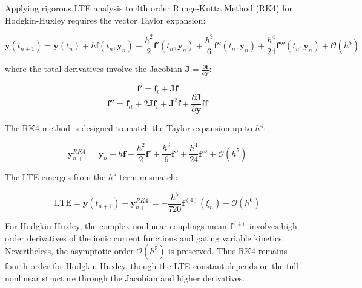 Applying rigorous LTE analysis to 4th order Runge-Kutta Method (RK4) for Hodgkin-Huxley requires the vector Taylor expansion:

\[
\mathbf{y}(t_{n+1}) = \mathbf{y}(t_n) + h\mathbf{f}(t_n, \mathbf{y}_n) + \frac{h^2}{2}\mathbf{f}'(t_n, \mathbf{y}_n) + \frac{h^3}{6}\mathbf{f}''(t_n, \mathbf{y}_n) + \frac{h^4}{24}\mathbf{f}'''(t_n, \mathbf{y}_n) + \mathcal{O}(h^5)
\]

where the total derivatives involve the Jacobian $\mathbf{J} = \frac{\partial \mathbf{f}}{\partial \mathbf{y}}$:

\[
\mathbf{f}' = \mathbf{f}_t + \mathbf{J}\mathbf{f}
\]
\[
\mathbf{f}'' = \mathbf{f}_{tt} + 2\mathbf{J}\mathbf{f}_t + \mathbf{J}^2\mathbf{f} + \frac{\partial \mathbf{J}}{\partial \mathbf{y}}\mathbf{f}\mathbf{f}
\]

The RK4 method is designed to match the Taylor expansion up to $h^4$:

\[
\mathbf{y}_{n+1}^{RK4} = \mathbf{y}_n + h\mathbf{f} + \frac{h^2}{2}\mathbf{f}' + \frac{h^3}{6}\mathbf{f}'' + \frac{h^4}{24}\mathbf{f}''' + \mathcal{O}(h^5)
\]

The LTE emerges from the $h^5$ term mismatch:

\[
\text{LTE} = \mathbf{y}(t_{n+1}) - \mathbf{y}_{n+1}^{RK4} = -\frac{h^5}{720}\mathbf{f}^{(4)}(\xi_n) + \mathcal{O}(h^6)
\]

For Hodgkin-Huxley, the complex nonlinear couplings mean $\mathbf{f}^{(4)}$ involves high-order derivatives of the ionic current functions and gating variable kinetics. Nevertheless, the asymptotic order $\mathcal{O}(h^5)$ is preserved.
Thus RK4 remains fourth-order for Hodgkin-Huxley, though the LTE constant depends on the full nonlinear structure through the Jacobian and higher derivatives.